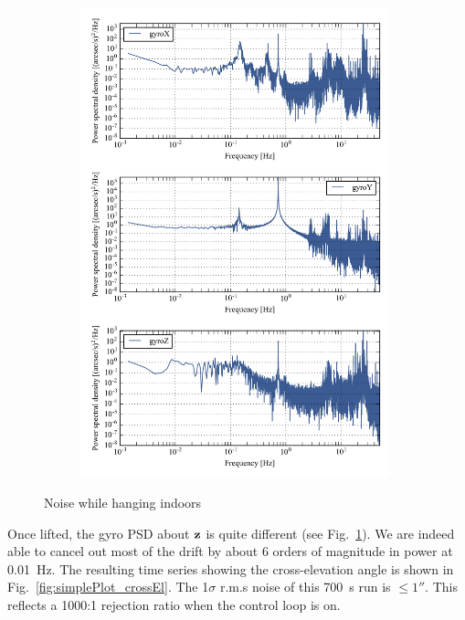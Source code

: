 \begin{landscape}
\begin{figure}[!h]
\begin{subfigure}[b]{0.7\textwidth}
	\includegraphics[width=0.98\textwidth]{Figures/multiPSD100.png}
	\caption{}
	\label{fig:multiPSD100_controlled}
	\end{subfigure}
\caption[Noise while hanging]{Noise while hanging indoors}
\label{fig:multiPSD}
\end{figure}
\end{landscape}



Once lifted, the gyro PSD about $\textrm{\textbf{z}}$ is quite different (see Fig.~\ref{fig:multiPSD100_controlled}). We are indeed able to cancel out most of the drift by about 6 orders of magnitude in power at \SI{0.01}{\hertz}. The resulting time series showing the cross-elevation angle is shown in Fig.~\ref{fig:simplePlot_crossEl}. The 1$\sigma$ r.m.s noise of this \SI{700}{\second} run is $\le\ang{;;1}$. This reflects a 1000:1 rejection ratio when the control loop is on.


